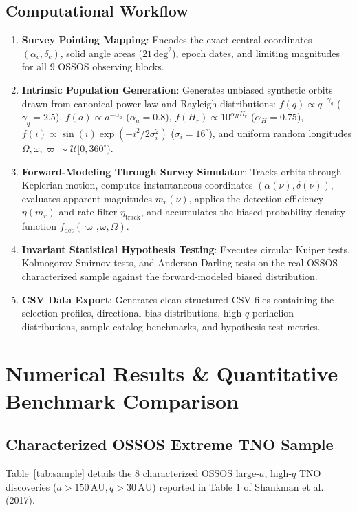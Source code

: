 \documentclass[11pt,a4paper]{article}
\begin{document}
\subsection{Computational Workflow}
\begin{enumerate}
    \item \textbf{Survey Pointing Mapping}: Encodes the exact central coordinates $(\alpha_c, \delta_c)$, solid angle areas ($21\,\text{deg}^2$), epoch dates, and limiting magnitudes for all 9 OSSOS observing blocks.
    \item \textbf{Intrinsic Population Generation}: Generates unbiased synthetic orbits drawn from canonical power-law and Rayleigh distributions: $f(q) \propto q^{-\gamma_q}$ ($\gamma_q = 2.5$), $f(a) \propto a^{-\alpha_a}$ ($\alpha_a = 0.8$), $f(H_r) \propto 10^{\alpha_H H_r}$ ($\alpha_H = 0.75$), $f(i) \propto \sin(i) \exp(-i^2/2\sigma_i^2)$ ($\sigma_i = 16^\circ$), and uniform random longitudes $\Omega, \omega, \varpi \sim \mathcal{U}[0, 360^\circ)$.
    \item \textbf{Forward-Modeling Through Survey Simulator}: Tracks orbits through Keplerian motion, computes instantaneous coordinates $(\alpha(\nu), \delta(\nu))$, evaluates apparent magnitudes $m_r(\nu)$, applies the detection efficiency $\eta(m_r)$ and rate filter $\eta_{\text{track}}$, and accumulates the biased probability density function $f_{\text{det}}(\varpi, \omega, \Omega)$.
    \item \textbf{Invariant Statistical Hypothesis Testing}: Executes circular Kuiper tests, Kolmogorov-Smirnov tests, and Anderson-Darling tests on the real OSSOS characterized sample against the forward-modeled biased distribution.
    \item \textbf{CSV Data Export}: Generates clean structured CSV files containing the selection profiles, directional bias distributions, high-$q$ perihelion distributions, sample catalog benchmarks, and hypothesis test metrics.
\end{enumerate}

\section{Numerical Results \& Quantitative Benchmark Comparison}

\subsection{Characterized OSSOS Extreme TNO Sample}
Table~\ref{tab:sample} details the 8 characterized OSSOS large-$a$, high-$q$ TNO discoveries ($a > 150\,\text{AU}, q > 30\,\text{AU}$) reported in Table 1 of Shankman et al. (2017).
\end{document}
